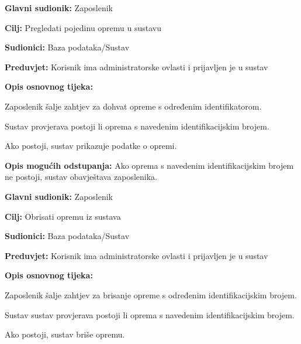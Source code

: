                 \noindent {}
					\begin{packed_item}
	
						\item \textbf{Glavni sudionik: }Zaposlenik
						\item  \textbf{Cilj:} Pregledati pojedinu opremu u sustavu
						\item  \textbf{Sudionici:} Baza podataka/Sustav
						\item  \textbf{Preduvjet:} Korisnik ima administratorske ovlasti i prijavljen je u sustav
						\item  \textbf{Opis osnovnog tijeka:}
						
						\item[] \begin{packed_enum}
	
							\item Zaposlenik šalje zahtjev za dohvat opreme s određenim identifikatorom.
							\item Sustav provjerava postoji li oprema s navedenim identifikacijskim brojem.
                            \item Ako postoji, sustav prikazuje podatke o opremi.
	
						\end{packed_enum}
						
						\item  \textbf{Opis mogućih odstupanja:} Ako oprema s navedenim identifikacijskim brojem ne postoji, sustav obavještava zaposlenika.
						
						
					\end{packed_item}

                \noindent {}
					\begin{packed_item}
	
						\item \textbf{Glavni sudionik: }Zaposlenik
						\item  \textbf{Cilj:} Obrisati opremu iz sustava
						\item  \textbf{Sudionici:} Baza podataka/Sustav
						\item  \textbf{Preduvjet:} Korisnik ima administratorske ovlasti i prijavljen je u sustav
						\item  \textbf{Opis osnovnog tijeka:}
						
						\item[] \begin{packed_enum}
	
							\item Zaposlenik šalje zahtjev za brisanje opreme s određenim identifikacijskim brojem.
							\item Sustav sustav provjerava postoji li oprema s navedenim identifikacijskim brojem.
                            \item Ako postoji, sustav briše opremu.
	
						\end{packed_enum}
						
						
					\end{packed_item}

